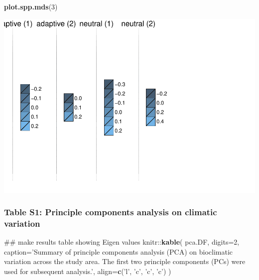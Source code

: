 \documentclass[11pt,]{article}
\newenvironment{Shaded}{\begin{snugshade}}{\end{snugshade}}
\newcommand{\KeywordTok}[1]{\textcolor[rgb]{0.13,0.29,0.53}{\textbf{{#1}}}}
\newcommand{\DataTypeTok}[1]{\textcolor[rgb]{0.13,0.29,0.53}{{#1}}}
\newcommand{\DecValTok}[1]{\textcolor[rgb]{0.00,0.00,0.81}{{#1}}}
\newcommand{\StringTok}[1]{\textcolor[rgb]{0.31,0.60,0.02}{{#1}}}
\newcommand{\NormalTok}[1]{{#1}}
\let\origfigure\figure
\let\endorigfigure\endfigure
\renewenvironment{figure}[1][2] {
	\expandafter\origfigure\expandafter[H]
} {
	\endorigfigure
}
\begin{document}
\begin{Shaded}
\begin{Highlighting}[]
\KeywordTok{plot.spp.mds}\NormalTok{(}\DecValTok{3}\NormalTok{)}
\end{Highlighting}
\end{Shaded}

\begin{figure}[htbp]
\centering
\includegraphics{article_files/figure-latex/unnamed-chunk-14-1.pdf}
\caption{Distribution of adaptive and neutral genetic variation in
\textit{Campanula barbata}. See Figure XX caption for conventions.}
\end{figure}

\subsubsection{Table S1: Principle components analysis on climatic
variation}\label{table-s1-principle-components-analysis-on-climatic-variation}

\begin{Shaded}
\begin{Highlighting}[]
\NormalTok{## make results table showing Eigen values}
\NormalTok{knitr::}\KeywordTok{kable}\NormalTok{(}
    \NormalTok{pca.DF,}
    \DataTypeTok{digits=}\DecValTok{2}\NormalTok{,}
    \DataTypeTok{caption=}\StringTok{'Summary of principle components analysis (PCA) on bioclimatic variation across the study area. The first two principle components (PCs) were used for subsequent analysis.'}\NormalTok{,}
    \DataTypeTok{align=}\KeywordTok{c}\NormalTok{(}\StringTok{'l'}\NormalTok{, }\StringTok{'c'}\NormalTok{, }\StringTok{'c'}\NormalTok{, }\StringTok{'c'}\NormalTok{)}
\NormalTok{)}
\end{Highlighting}
\end{Shaded}
\end{document}
